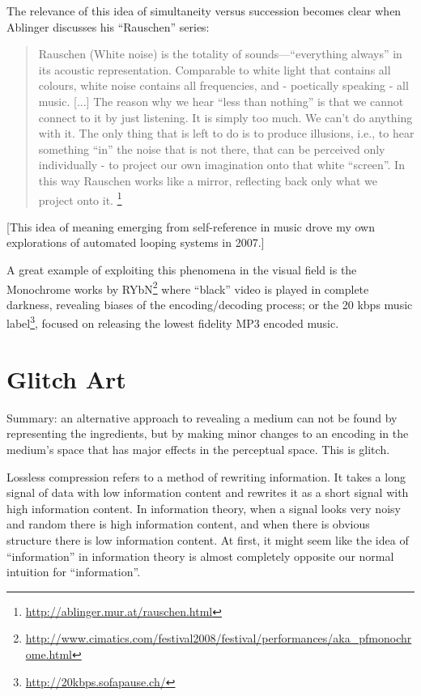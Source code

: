 \documentclass{thesis}
\begin{document}
	The relevance of this idea of simultaneity versus succession becomes clear when Ablinger discusses his ``Rauschen'' series:
	
	\begin{quote}
	Rauschen (White noise) is the totality of sounds---``everything always'' in its acoustic representation. Comparable to white light that contains all colours, white noise contains all frequencies, and - poetically speaking - all music. [...] The reason why we hear ``less than nothing'' is that we cannot connect to it by just listening. It is simply too much. We can't do anything with it. The only thing that is left to do is to produce illusions, i.e., to hear something ``in'' the noise that is not there, that can be perceived only individually - to project our own imagination onto that white ``screen''. In this way Rauschen works like a mirror, reflecting back only what we project onto it. \footnote{\url{http://ablinger.mur.at/rauschen.html}}
	\end{quote}

	[This idea of meaning emerging from self-reference in music drove my own explorations of automated looping systems in 2007.]
	
	A great example of exploiting this phenomena in the visual field is the Monochrome works by RYbN\footnote{\url{http://www.cimatics.com/festival2008/festival/performances/aka_pfmonochrome.html}} where ``black'' video is played in complete darkness, revealing biases of the encoding/decoding process; or the 20 kbps music label\footnote{\url{http://20kbps.sofapause.ch/}}, focused on releasing the lowest fidelity MP3 encoded music.
	
\section{Glitch Art}
	Summary: an alternative approach to revealing a medium can not be found by representing the ingredients, but by making minor changes to an encoding in the medium's space that has major effects in the perceptual space. This is glitch.
	
	Lossless compression refers to a method of rewriting information. It takes a long signal of data with low information content and rewrites it as a short signal with high information content. In information theory, when a signal looks very noisy and random there is high information content, and when there is obvious structure there is low information content. At first, it might seem like the idea of ``information'' in information theory is almost completely opposite our normal intuition for ``information''.
	
\end{document}
